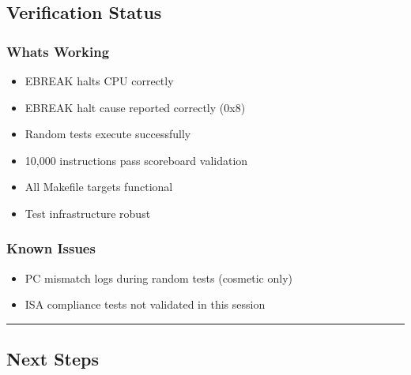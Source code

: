 \subsection{Verification Status}\label{cr:app:archive-session-summary:verification-status}

\subsubsection{\texorpdfstring{What\textquotesingle s Working
\ok{}}{What\textquotesingle s Working }}\label{cr:app:archive-session-summary:whats-working-white-check-mark}

\begin{record}

\begin{itemize}
\tightlist
\item
  \ok{} EBREAK halts CPU correctly
\item
  \ok{} EBREAK halt cause reported correctly (0x8)
\item
  \ok{} Random tests execute successfully
\item
  \ok{} 10,000 instructions pass scoreboard validation
\item
  \ok{} All Makefile targets functional
\item
  \ok{} Test infrastructure robust
\end{itemize}

\end{record}

\subsubsection{Known Issues}\label{cr:app:archive-session-summary:known-issues}

\begin{record}

\begin{itemize}
\tightlist
\item
  \warn{} PC mismatch logs during random tests (cosmetic only)
\item
  \warn{} ISA compliance tests not validated in this session
\end{itemize}

\begin{center}\rule{0.5\linewidth}{0.5pt}\end{center}

\end{record}

\subsection{Next Steps}\label{cr:app:archive-session-summary:next-steps}


